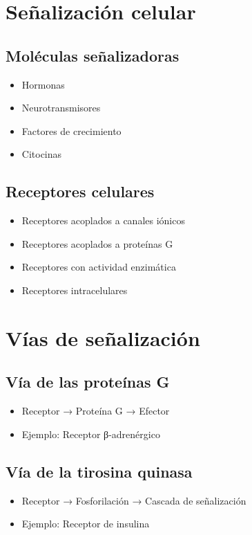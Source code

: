 \section{Señalización celular}

\subsection{Moléculas señalizadoras}
\begin{itemize}
    \item Hormonas
    \item Neurotransmisores
    \item Factores de crecimiento
    \item Citocinas
\end{itemize}

\subsection{Receptores celulares}
\begin{itemize}
    \item Receptores acoplados a canales iónicos
    \item Receptores acoplados a proteínas G
    \item Receptores con actividad enzimática
    \item Receptores intracelulares
\end{itemize}

\section{Vías de señalización}

\subsection{Vía de las proteínas G}
\begin{itemize}
    \item Receptor → Proteína G → Efector
    \item Ejemplo: Receptor β-adrenérgico
\end{itemize}

\subsection{Vía de la tirosina quinasa}
\begin{itemize}
    \item Receptor → Fosforilación → Cascada de señalización
    \item Ejemplo: Receptor de insulina
\end{itemize}


